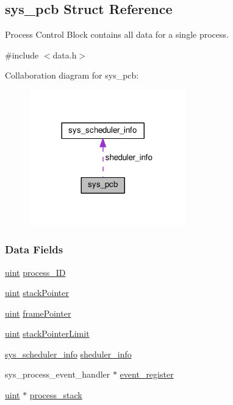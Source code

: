 \hypertarget{structsys__pcb}{}\subsection{sys\+\_\+pcb Struct Reference}
\label{structsys__pcb}


Process Control Block contains all data for a single process.  




{\ttfamily \#include $<$data.\+h$>$}



Collaboration diagram for sys\+\_\+pcb\+:\nopagebreak
\begin{figure}[H]
\begin{center}
\leavevmode
\includegraphics[width=192pt]{d4/dd5/structsys__pcb__coll__graph}
\end{center}
\end{figure}
\subsubsection*{Data Fields}
\begin{DoxyCompactItemize}
\item 
\hyperlink{definitions_8h_a1445ebbbf93d62972255ec5e89a5ab01}{uint} \hyperlink{structsys__pcb_a11351019f4ef27eedfdd0ce37c2295b7}{process\+\_\+\+I\+D}
\item 
\hyperlink{definitions_8h_a1445ebbbf93d62972255ec5e89a5ab01}{uint} \hyperlink{structsys__pcb_a02da00ceff54f8cc4dba8cfdb92094f6}{stack\+Pointer}
\item 
\hyperlink{definitions_8h_a1445ebbbf93d62972255ec5e89a5ab01}{uint} \hyperlink{structsys__pcb_a8f7cd57c4feb12f1fcda4f675e68f525}{frame\+Pointer}
\item 
\hyperlink{definitions_8h_a1445ebbbf93d62972255ec5e89a5ab01}{uint} \hyperlink{structsys__pcb_a0321026d7029970d2a9e2bf3ffc31763}{stack\+Pointer\+Limit}
\item 
\hyperlink{structsys__scheduler__info}{sys\+\_\+scheduler\+\_\+info} \hyperlink{structsys__pcb_a590605cd2630ebc18d854f668a0696f2}{sheduler\+\_\+info}
\item 
sys\+\_\+process\+\_\+event\+\_\+handler $\ast$ \hyperlink{structsys__pcb_afd9aeee04956909043bb0a7fe5915bcb}{event\+\_\+register}
\item 
\hyperlink{definitions_8h_a1445ebbbf93d62972255ec5e89a5ab01}{uint} $\ast$ \hyperlink{structsys__pcb_a9ae44700870c76d5517c239ed30f7be0}{process\+\_\+stack}
\end{DoxyCompactItemize}


